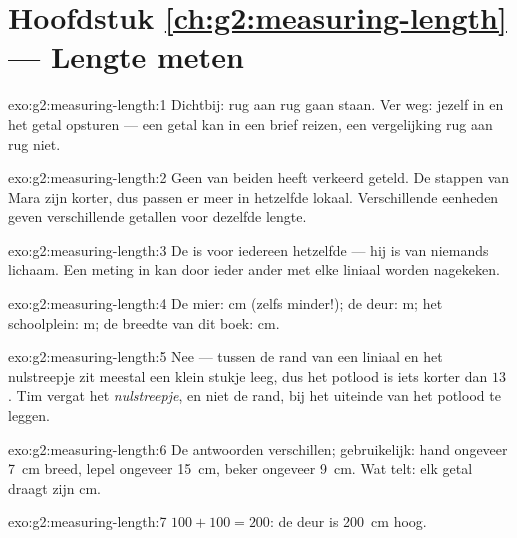 \section*{Hoofdstuk \ref{ch:g2:measuring-length} --- Lengte meten}

\begin{solution}{exo:g2:measuring-length:1}
Dichtbij: rug aan rug gaan staan. Ver weg: jezelf in
  en het getal opsturen --- een getal kan in een
brief reizen, een vergelijking rug aan rug niet.
\end{solution}

\begin{solution}{exo:g2:measuring-length:2}
Geen van beiden heeft verkeerd geteld. De stappen van Mara zijn
korter, dus passen er meer in hetzelfde lokaal. Verschillende
eenheden geven verschillende getallen voor dezelfde lengte.
\end{solution}

\begin{solution}{exo:g2:measuring-length:3}
De  is voor iedereen hetzelfde --- hij is van niemands
lichaam. Een meting in  kan door ieder ander met elke
liniaal worden nagekeken.
\end{solution}

\begin{solution}{exo:g2:measuring-length:4}
De mier: \unit{cm} (zelfs minder!); de deur: \unit{m}; het
schoolplein: \unit{m}; de breedte van dit boek: \unit{cm}.
\end{solution}

\begin{solution}{exo:g2:measuring-length:5}
Nee --- tussen de rand van een liniaal en het nulstreepje zit meestal
een klein stukje leeg, dus het potlood is iets korter dan $13$
. Tim vergat het \emph{nulstreepje}, en niet de rand, bij
het uiteinde van het potlood te leggen.
\end{solution}

\begin{solution}{exo:g2:measuring-length:6}
De antwoorden verschillen; gebruikelijk: hand ongeveer \qty{7}{cm}
breed, lepel ongeveer \qty{15}{cm}, beker ongeveer \qty{9}{cm}. Wat
telt: elk getal draagt zijn \unit{cm}.
\end{solution}

\begin{solution}{exo:g2:measuring-length:7}
$100 + 100 = 200$: de deur is \qty{200}{cm} hoog.
\end{solution}


